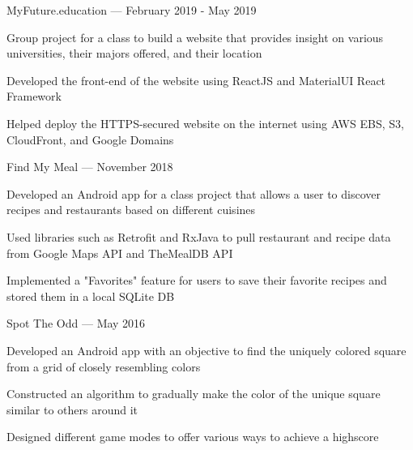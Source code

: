 


\begin{cventries}


\cventryalt
{MyFuture.education --- } %
{February 2019 - May 2019} %
{ %
\begin{cvitems}
\item {Group project for a class to build a website that provides insight on various universities, their majors offered, and their location}
\item {Developed the front-end of the website using ReactJS and MaterialUI React Framework}
\item {Helped deploy the HTTPS-secured website on the internet using AWS EBS, S3, CloudFront, and Google Domains}
\end{cvitems}
}


\cventryalt
{Find My Meal --- } %
{November 2018} %
{ %
\begin{cvitems}
\item {Developed an Android app for a class project that allows a user to discover recipes and restaurants based on different cuisines}
\item {Used libraries such as Retrofit and RxJava to pull restaurant and recipe data from Google Maps API and TheMealDB API}
\item {Implemented a "Favorites" feature for users to save their favorite recipes and stored them in a local SQLite DB}
\end{cvitems}
}


\cventryalt
{Spot The Odd --- } %
{May 2016} %
{ %
\begin{cvitems}
\item {Developed an Android app with an objective to find the uniquely colored square from a grid of closely resembling colors}
\item {Constructed an algorithm to gradually make the color of the unique square similar to others around it}
\item {Designed different game modes to offer various ways to achieve a highscore}
\end{cvitems}
}


\end{cventries}